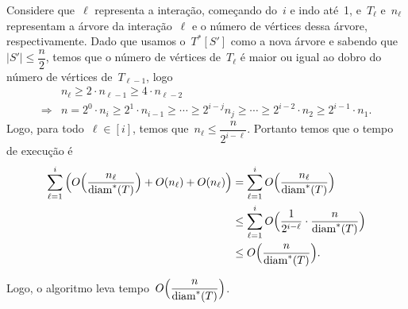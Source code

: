 		Considere que~$\ell$ representa a interação,
		começando do~$i$ e indo até~1, e~$T_\ell$ e~$n_\ell$ 
		representam a árvore da interação~$\ell$ e
		o número de vértices dessa árvore, respectivamente.
		Dado que usamos o~$T^*[S']$ como a nova árvore
		e sabendo que~$|S'|\le \dfrac{n}{2}$,
		temos que o número de vértices de~$T_{\ell}$
		é maior ou igual ao 
		dobro do número de vértices de~$T_{\ell-1}$, logo
		\begin{align}
			 & n_{\ell} \ge 2\cdot n_{\ell-1} \ge 4\cdot n_{\ell-2} \nonumber\\
			\Rightarrow & n = 2^0\cdot n_i\ge 2^1\cdot n_{i-1} \ge\cdots\ge
			2^{i-j}n_j\ge\cdots\ge
			 2^{i-2}\cdot n_{2}\ge 2^{i-1}\cdot n_1. \nonumber 
		\end{align}
		Logo, para todo~$\ell\in[i]$, temos que~$n_\ell \le\dfrac{n} {2^{i-\ell}}$.
		Portanto temos que o tempo de execução é
		\begin{align}
			\displaystyle\sum_{\ell=1}^{i} \Big(O\Big(\dfrac{n_\ell}{\mathrm{diam}^*(T)}\Big)
			+ O(n_\ell) + O(n_\ell)\Big)
			&= \displaystyle\sum_{\ell=1}^{i} O\Big(\dfrac{n_\ell}{\mathrm{diam}^*(T)}\Big) \nonumber\\
			&\le \displaystyle\sum_{\ell=1}^{i} O\Big(\dfrac{1}{2^{i-\ell}}
			\cdot\dfrac{n}{\mathrm{diam}^*(T)}\Big) \nonumber\\
			&\le O\Big(\dfrac{n}{\mathrm{diam}^*(T)}\Big). \nonumber
		\end{align}

		Logo, o algoritmo leva tempo~$O\Big(\dfrac{n}{\mathrm{diam}^*(T)}\Big)$.

